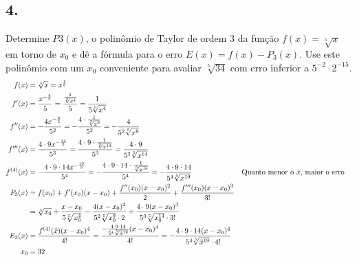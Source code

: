 \documentclass{article}
\begin{document}
\subsection{4.}
Determine $P3(x)$, o polinômio de Taylor de ordem 3 da função
$f(x) = \sqrt[5]{x}$ em torno de $x_0$ e dê a fórmula para o erro
$E(x) = f(x) - P_3(x)$.  Use este polinômio com um $x_0$ conveniente para
avaliar $\sqrt[5]{34}$ com erro inferior a $5^{-2} \cdot 2^{-15}$.
\begin{align}
  f(x)
  &= \sqrt[5]{x}
  = x^{\frac{1}{5}} \\
  f'(x)
  &= \frac{x^{-\frac{4}{5}}}{5}
  = \frac{\frac{1}{\sqrt[5]{x^4}}}{5}
  = \frac{1}{5\sqrt[5]{x^4}} \\
  f''(x)
  &= -\frac{4x^{-\frac{9}{5}}}{5^2}
  = -\frac{4 \cdot \frac{1}{\sqrt[5]{x^9}}}{5^2}
  = -\frac{4}{5^2 \sqrt[5]{x^9}} \\
  f'''(x)
  &= \frac{4 \cdot 9x^{-\frac{14}{5}}}{5^3}
  = \frac{4 \cdot 9 \cdot \frac{1}{\sqrt[5]{x^{14}}}}{5^3}
  = \frac{4 \cdot 9}{5^3\sqrt[5]{x^{14}}} \\
  f^{(4)}(x)
  &= -\frac{4 \cdot 9 \cdot 14x^{-\frac{19}{5}}}{5^4}
  = -\frac{4 \cdot 9 \cdot 14 \cdot \frac{1}{\sqrt[5]{x^{19}}}}{5^4}
  = -\frac{4 \cdot 9 \cdot 14}{5^4 \sqrt[5]{x^{19}}}
  && \text{Quanto menor o $\bar{x}$, maior o erro} \\
  P_3(x)
  &= f(x_0) + f'(x_0)(x - x_0) + \frac{f''(x_0)(x - x_0)^2}{2} +
  \frac{f'''(x_0)(x - x_0)^3}{3!} \\
  &= \sqrt[5]{x_0} +
  \frac{x - x_0}{5\sqrt[5]{x_0^4}} -
  \frac{4(x - x_0)^2}{5^2 \sqrt[5]{x_0^9} \cdot 2} +
  \frac{4 \cdot 9(x - x_0)^3}{5^3 \sqrt[5]{x_0^{14}} \cdot 3!} \notag \\
  E_3(x)
  &= \frac{f^{(4)}(\bar{x})(x - x_0)^4}{4!}
  = \frac{-\frac{4 \cdot 9 \cdot 14}{5^4 \sqrt[5]{\bar{x}^{19}}}(x - x_0)^4}{4!}
  = -\frac{4 \cdot 9 \cdot 14(x - x_0)^4}{5^4\sqrt[5]{\bar{x}^{19}} \cdot 4!} \\
  x_0
  &= 32 \\

\end{align}
\end{document}
